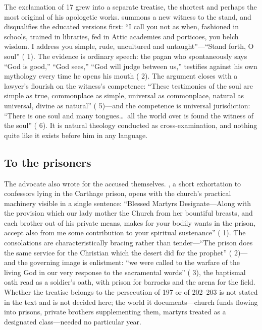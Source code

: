 The exclamation of  17 grew into a separate treatise, the
shortest and perhaps the most original of his apologetic works.  summons a new witness to the stand, and disqualifies
the educated versions first: ``I call you not as when, fashioned in schools,
trained in libraries, fed in Attic academies and porticoes, you belch wisdom.
I address you simple, rude, uncultured and untaught''---``Stand forth, O
soul'' ( 1). The evidence is ordinary speech:
the pagan who spontaneously says ``God is good,'' ``God sees,'' ``God will
judge between us,'' testifies against his own mythology every time he opens
his mouth ( 2). The argument closes with a
lawyer's flourish on the witness's competence: ``These testimonies of the soul
are simple as true, commonplace as simple, universal as commonplace, natural
as universal, divine as natural'' ( 5)---and
the competence is universal jurisdiction: ``There is one soul and many
tongues\ldots\ all the world over is found the witness of the soul''
( 6). It is
natural theology conducted as cross-examination, and nothing quite like it
exists before him in any language.

\subsection{To the prisoners}

The advocate also wrote for the accused themselves. , a
short exhortation to confessors lying in the Carthage prison, opens with the
church's practical machinery visible in a single sentence: ``Blessed Martyrs
Designate---Along with the provision which our lady mother the Church from her
bountiful breasts, and each brother out of his private means, makes for your
bodily wants in the prison, accept also from me some contribution to your
spiritual sustenance'' ( 1). The consolations are
characteristically bracing rather than tender---``The prison does the same
service for the Christian which the desert did for the prophet'' ( 2)---and the governing image is enlistment: ``we were called to the
warfare of the living God in our very response to the sacramental words''
( 3), the baptismal oath read as a soldier's oath, with
prison for barracks and the arena for the field. Whether the treatise belongs
to the persecution of 197 or of 202--203 is not stated in the text and is not
decided here; the world it documents---church funds flowing into prisons,
private brothers supplementing them, martyrs treated as a designated
class---needed no particular year.

